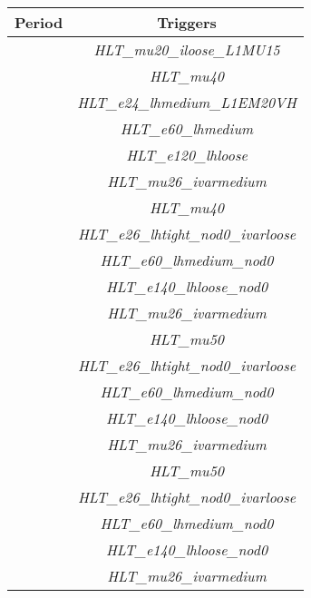 \documentclass[NOTE, atlasdraft=true, texlive=2017, UKenglish]{\ATLASLATEXPATH atlasdoc}
\begin{document}
\begin{table}[!htbp]{\footnotesize\renewcommand{\arraystretch}{1.2}
    \begin{center}
      \begin{tabular}{|c|c|}
        \hline
        Period & Triggers\\
        \hline
        \multirow{2}{*}{\parbox[t]{2mm}{}} & \emph{HLT\_mu20\_iloose\_L1MU15}\\
        & \emph{HLT\_mu40}\\
        & \emph{HLT\_e24\_lhmedium\_L1EM20VH}\\
        & \emph{HLT\_e60\_lhmedium}\\
        & \emph{HLT\_e120\_lhloose}\\
        \hline
        \multirow{2}{*}{\parbox[t]{2mm}{}} & \emph{HLT\_mu26\_ivarmedium}\\
        & \emph{HLT\_mu40}\\
        & \emph{HLT\_e26\_lhtight\_nod0\_ivarloose}\\
        & \emph{HLT\_e60\_lhmedium\_nod0}\\
        & \emph{HLT\_e140\_lhloose\_nod0}\\
        \hline
        \multirow{2}{*}{\parbox[t]{2mm}{}} & \emph{HLT\_mu26\_ivarmedium}\\
        & \emph{HLT\_mu50}\\
        & \emph{HLT\_e26\_lhtight\_nod0\_ivarloose}\\
        & \emph{HLT\_e60\_lhmedium\_nod0}\\
        & \emph{HLT\_e140\_lhloose\_nod0}\\
        \hline
        \multirow{2}{*}{\parbox[t]{2mm}{}} & \emph{HLT\_mu26\_ivarmedium}\\
        & \emph{HLT\_mu50}\\
        & \emph{HLT\_e26\_lhtight\_nod0\_ivarloose}\\
        & \emph{HLT\_e60\_lhmedium\_nod0}\\
        & \emph{HLT\_e140\_lhloose\_nod0}\\
        \hline
        \multirow{2}{*}{\parbox[t]{2mm}{}} & \emph{HLT\_mu26\_ivarmedium}\\

\end{tabular}
\end{center}}
\end{table}
\end{document}

